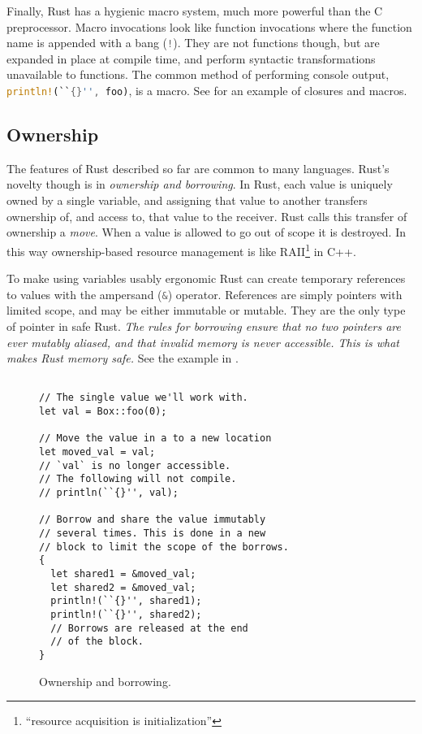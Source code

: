 Finally, Rust has a hygienic macro system, much more powerful than
the C preprocessor. Macro invocations look like function invocations
where the function name is appended with a bang (\lstinline[language=Rust]{!}).
They are not functions though, but are expanded in place at compile time,
and perform syntactic transformations unavailable to functions.
The common method of performing console output, \lstinline[language=Rust]~println!(``{}'', foo)~,
is a macro.
See  for an example of closures and macros.

\subsection{Ownership}
The features of Rust described so far are common to many languages.
Rust's novelty though is in \emph{ownership and borrowing}.
In Rust, each value is uniquely owned by a single variable, and
assigning that value to another transfers ownership of, and access to,
that value to the receiver. Rust calls this transfer of ownership a \emph{move}.
When a value is allowed to go out of scope
it is destroyed. In this way ownership-based resource management is
like RAII\footnote{``resource acquisition is initialization''} in C++.

To make using variables usably ergonomic Rust can create temporary
references to values with the ampersand (\lstinline[language=Rust]{&})
operator. References are simply pointers with limited scope, and may be either
immutable or mutable. They are the only type of pointer in safe Rust.
\emph{The rules for borrowing ensure that no two pointers are ever mutably
aliased, and that invalid memory is never accessible.
This is what makes Rust memory safe.} See the example in .

\begin{figure}
\begin{lstlisting}

// The single value we'll work with.
let val = Box::foo(0);

// Move the value in a to a new location
let moved_val = val;
// `val` is no longer accessible.
// The following will not compile.
// println(``{}'', val);

// Borrow and share the value immutably
// several times. This is done in a new
// block to limit the scope of the borrows.
{
  let shared1 = &moved_val;
  let shared2 = &moved_val;
  println!(``{}'', shared1);
  println!(``{}'', shared2);
  // Borrows are released at the end
  // of the block.
}
\end{lstlisting}
  \caption{Ownership and borrowing.}
  \label{fig:own}
\end{figure}

